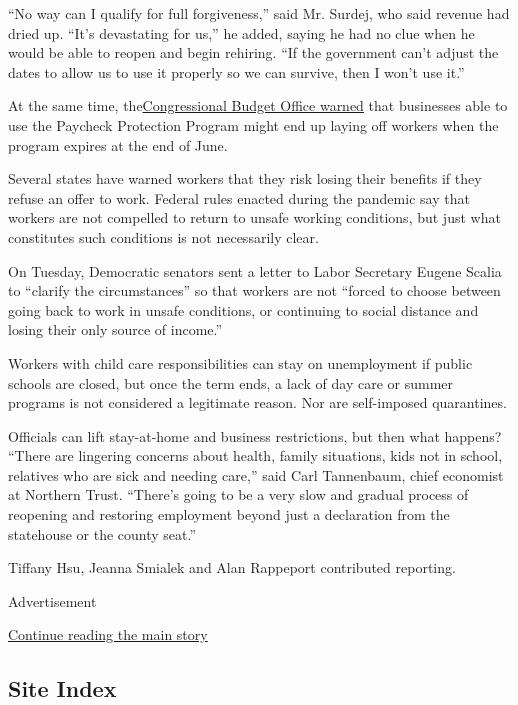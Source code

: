 ``No way can I qualify for full forgiveness,'' said Mr. Surdej, who said
revenue had dried up. ``It's devastating for us,'' he added, saying he
had no clue when he would be able to reopen and begin rehiring. ``If the
government can't adjust the dates to allow us to use it properly so we
can survive, then I won't use it.''

At the same time,
the\href{https://www.nytimes3xbfgragh.onion/2020/05/19/business/stock-market-today-coronavirus.html}{Congressional
Budget Office warned} that businesses able to use the Paycheck
Protection Program might end up laying off workers when the program
expires at the end of June.

Several states have warned workers that they risk losing their benefits
if they refuse an offer to work. Federal rules enacted during the
pandemic say that workers are not compelled to return to unsafe working
conditions, but just what constitutes such conditions is not necessarily
clear.

On Tuesday, Democratic senators sent a letter to Labor Secretary Eugene
Scalia to ``clarify the circumstances'' so that workers are not ``forced
to choose between going back to work in unsafe conditions, or continuing
to social distance and losing their only source of income.''

Workers with child care responsibilities can stay on unemployment if
public schools are closed, but once the term ends, a lack of day care or
summer programs is not considered a legitimate reason. Nor are
self-imposed quarantines.

Officials can lift stay-at-home and business restrictions, but then what
happens? ``There are lingering concerns about health, family situations,
kids not in school, relatives who are sick and needing care,'' said Carl
Tannenbaum, chief economist at Northern Trust. ``There's going to be a
very slow and gradual process of reopening and restoring employment
beyond just a declaration from the statehouse or the county seat.''

Tiffany Hsu, Jeanna Smialek and Alan Rappeport contributed reporting.

Advertisement

\protect\hyperlink{after-bottom}{Continue reading the main story}

\hypertarget{site-index}{%
\subsection{Site Index}\label{site-index}}

